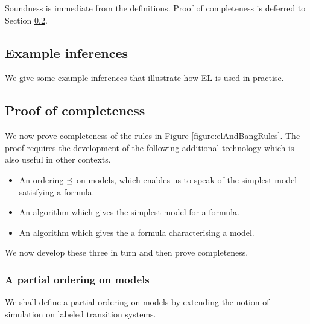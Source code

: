 \NI Soundness is immediate from the definitions. Proof of completeness is
deferred to Section \ref{completenessProof}. 

\subsection{Example inferences}

We give some example inferences that illustrate how EL is used in
practise.

\subsection{Proof of completeness}\label{completenessProof}

\NI We now prove completeness of the rules in Figure
\ref{figure:elAndBangRules}.  The proof requires the development of
the following additional technology which is also useful in other
contexts.

\begin{itemize}

\item An ordering $\preceq$ on models, which enables us to speak of
  the simplest model satisfying a formula.

\item An algorithm which gives the simplest model for a formula.

\item An algorithm which gives the a formula characterising a model.

\end{itemize}

\NI We now develop these three in turn and then prove completeness.

\subsubsection{A partial ordering on models}

We shall define a partial-ordering on models by extending the notion of simulation on labeled transition systems.

